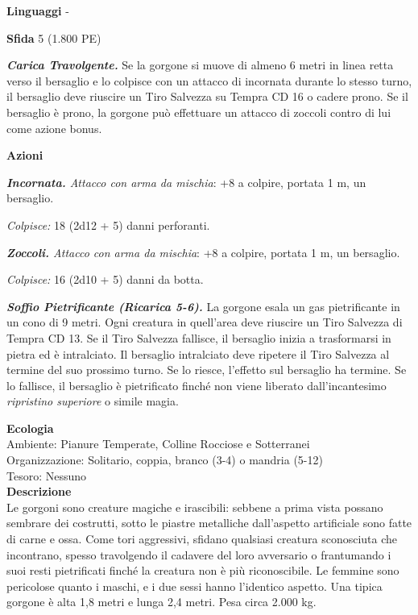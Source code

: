 \begin{multicols}{2}
\textbf{Linguaggi} -

\textbf{Sfida} 5 (1.800 PE)

\emph{\textbf{Carica Travolgente.}} Se la gorgone si muove di almeno 6 metri in linea retta verso il bersaglio e lo colpisce con un attacco di incornata durante lo stesso turno, il bersaglio deve riuscire un Tiro Salvezza su Tempra CD 16 o cadere prono. Se il bersaglio è prono, la gorgone può effettuare un attacco di zoccoli contro di lui come azione bonus.

\textbf{Azioni}

\emph{\textbf{Incornata.} Attacco con arma da mischia}: +8 a colpire, portata 1 m, un bersaglio.

\emph{Colpisce:} 18 (2d12 + 5) danni perforanti.

\emph{\textbf{Zoccoli.} Attacco con arma da mischia}: +8 a colpire, portata 1 m, un bersaglio.

\emph{Colpisce:} 16 (2d10 + 5) danni da botta.

\emph{\textbf{Soffio Pietrificante (Ricarica 5-6).}} La gorgone esala un gas pietrificante in un cono di 9 metri. Ogni creatura in quell'area deve riuscire un Tiro Salvezza di Tempra CD 13. Se il Tiro Salvezza fallisce, il bersaglio inizia a trasformarsi in pietra ed è intralciato. Il bersaglio intralciato deve ripetere il Tiro Salvezza al termine del suo prossimo turno. Se lo riesce, l'effetto sul bersaglio ha termine. Se lo fallisce, il bersaglio è pietrificato finché non viene liberato dall'incantesimo \emph{ripristino superiore} o simile magia.

\textbf{Ecologia}\\
Ambiente: Pianure Temperate, Colline Rocciose e Sotterranei\\
Organizzazione: Solitario, coppia, branco (3-4) o mandria (5-12)\\
Tesoro: Nessuno\\
\textbf{Descrizione}\\
Le gorgoni sono creature magiche e irascibili: sebbene a prima vista possano sembrare dei costrutti, sotto le piastre metalliche dall'aspetto artificiale sono fatte di carne e ossa. Come tori aggressivi, sfidano qualsiasi creatura sconosciuta che incontrano, spesso travolgendo il cadavere del loro avversario o frantumando i suoi resti pietrificati finché la creatura non è più riconoscibile. Le femmine sono pericolose quanto i maschi, e i due sessi hanno l'identico aspetto. Una tipica gorgone è alta 1,8 metri e lunga 2,4 metri. Pesa circa 2.000 kg.\\


\end{multicols}
